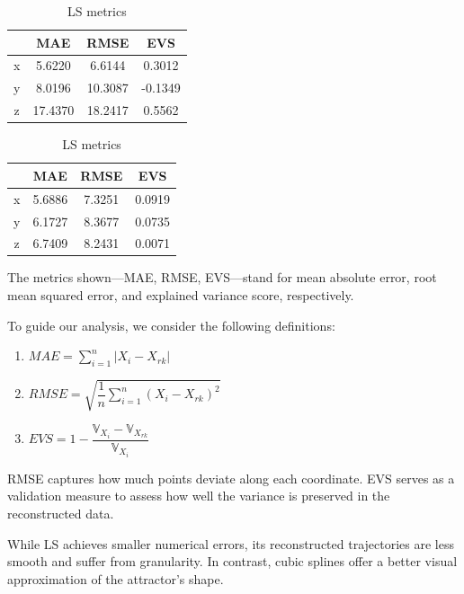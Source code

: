 \documentclass[12pt, a4paper]{article}
\begin{document}
	\begin{table}[htbp]
		\centering
		\begin{minipage}{0.45\textwidth}
			\centering
			\caption{Cubic spline metrics}
			\begin{tabular}{|c|c|c|c|}
				\hline
				  & MAE     & RMSE    & EVS     \\
				\hline
				x & 5.6220  & 6.6144  & 0.3012  \\ \hline
				y & 8.0196  & 10.3087 & -0.1349 \\ \hline
				z & 17.4370 & 18.2417 & 0.5562  \\ \hline
			\end{tabular}
		\end{minipage}%
		\hfill
		\begin{minipage}{0.45\textwidth}
			\centering
			\caption{LS metrics}
			\begin{tabular}{|c|c|c|c|}
				\hline
				  & MAE    & RMSE   & EVS    \\
				\hline
				x & 5.6886 & 7.3251 & 0.0919 \\ \hline
				y & 6.1727 & 8.3677 & 0.0735 \\ \hline
				z & 6.7409 & 8.2431 & 0.0071 \\ \hline
			\end{tabular}
		\end{minipage}
	\end{table}
	
	The metrics shown—MAE, RMSE, EVS—stand for mean absolute error, root mean squared error, and explained variance score, respectively.
	
	To guide our analysis, we consider the following definitions:
	
	\begin{enumerate}
		\item $MAE = \sum_{i=1}^n |X_i - X_{rk}|$
		\item $RMSE = \sqrt{\dfrac{1}{n} \sum_{i=1}^n (X_i - X_{rk})^2}$
		\item $EVS = 1 - \dfrac{\mathbb{V}_{X_i} - \mathbb{V}_{X_{rk}}}{\mathbb{V}_{X_i}}$
	\end{enumerate}
	
	RMSE captures how much points deviate along each coordinate. EVS serves as a validation measure to assess how well the variance is preserved in the reconstructed data.
	
	While LS achieves smaller numerical errors, its reconstructed trajectories are less smooth and suffer from granularity. In contrast, cubic splines offer a better visual approximation of the attractor's shape.
	
	    
	\newpage
	
	
\end{document}
